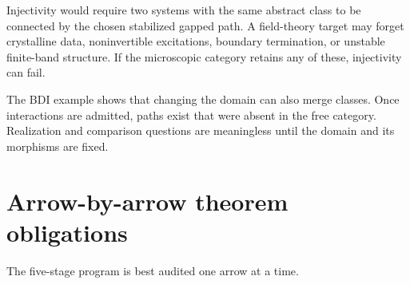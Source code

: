 \documentclass[12pt]{article}
\theoremstyle{definition}
\theoremstyle{remark}
\begin{document}
Injectivity would require two systems with the same abstract class to be
connected by the chosen stabilized gapped path.  A field-theory target may
forget crystalline data, noninvertible excitations, boundary termination,
or unstable finite-band structure.  If the microscopic category retains any
of these, injectivity can fail.

The BDI example shows that changing the domain can also merge classes.  Once
interactions are admitted, paths exist that were absent in the free
category.  Realization and comparison questions are meaningless until the
domain and its morphisms are fixed.

\section{Arrow-by-arrow theorem obligations}

The five-stage program is best audited one arrow at a time.
\end{document}
